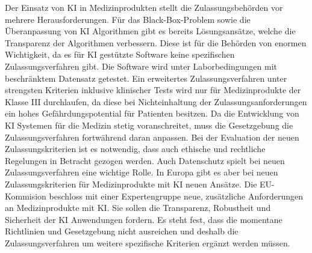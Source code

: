 Der Einsatz von KI in Medizinprodukten stellt die Zulassungsbehörden vor mehrere Herausforderungen. Für das Black-Box-Problem sowie die Überanpassung von KI Algorithmen gibt es bereits Lösungsansätze, welche die Transparenz der Algorithmen verbessern. Diese ist für die Behörden von enormen Wichtigkeit, da es für KI gestützte Software keine spezifischen Zulassungsverfahren gibt. Die Software wird unter Laborbedingungen mit beschränktem Datensatz getestet. Ein erweitertes Zulassungsverfahren unter strengsten Kriterien inklusive klinischer Tests wird nur für Medizinprodukte der Klasse III durchlaufen, da diese bei Nichteinhaltung der Zulassungsanforderungen ein hohes Gefährdungspotential für Patienten besitzen.
Da die Entwicklung von KI Systemen für die Medizin stetig voranschreitet, muss die Gesetzgebung die Zulassungsverfahren fortwährend daran anpassen. Bei der Evaluation der neuen Zulassungskriterien ist es notwendig, dass auch ethische und rechtliche Regelungen in Betracht gezogen werden. Auch Datenschutz spielt bei neuen Zulassungsverfahren eine wichtige Rolle. 
In Europa gibt es aber bei neuen Zulassungskriterien für Medizinprodukte mit KI neuen Ansätze. Die EU-Kommision beschloss mit einer Expertengruppe neue, zusätzliche Anforderungen an Medizinprodukte mit KI. Sie sollen die Transparenz, Robustheit und Sicherheit der KI Anwendungen fordern. Es steht fest, dass die momentane Richtlinien und Gesetzgebung nicht ausreichen und deshalb die Zulassungsverfahren um weitere spezifische Kriterien ergänzt werden müssen.